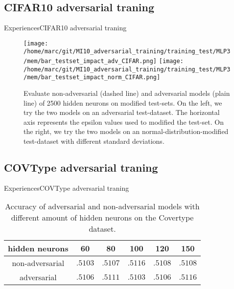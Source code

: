 \documentclass[10pt]{beamer}
\begin{document}
\subsection{CIFAR10 adversarial traning}
\begin{frame}{Experiences}{CIFAR10 adversarial traning}
  \pause
  \begin{figure}
    \centering
    \texttt{[image: /home/marc/git/MI10\_adversarial\_training/training\_test/MLP3/mem/bar\_testset\_impact\_adv\_CIFAR.png]}
    \texttt{[image: /home/marc/git/MI10\_adversarial\_training/training\_test/MLP3/mem/bar\_testset\_impact\_norm\_CIFAR.png]}
    \caption{Evaluate non-adversarial (dashed line) and adversarial models (plain line) of 2500 hidden neurons on modified test-sets. On the left, we try the two models on an adversarial test-dataset. The horizontal axis represents the epsilon values used to modified the test-set. On the right, we try the two models on an normal-distribution-modified test-dataset with different standard deviations.}
    \label{fig:cifar_noisy_test}
  \end{figure}
\end{frame}

\subsection{COVType adversarial traning}
\begin{frame}{Experiences}{COVType adversarial traning}
  \pause
  \begin{table}[ht]
    \centering
    \begin{tabular}{c||c|c|c|c|c}
      hidden neurons & 60 & 80 & 100 & 120 & 150 \\
      \hline
      non-adversarial & $.5103$ & $.5107$ & $.5116$ & $.5108$ & $.5108$ \\
      adversarial     & $.5106$ & $.5111$ & $.5103$ & $.5106$ & $.5116$ \\
    \end{tabular}
    \caption{Accuracy of adversarial and non-adversarial models with different amount of hidden neurons on the Covertype dataset.}
    \label{tab:cov_acc}
  \end{table}
\end{frame}



{\aauwavesbg
\begin{frame}
\end{frame}}
\end{document}
